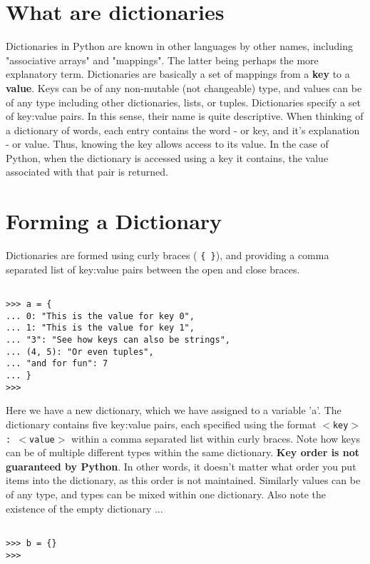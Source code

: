 \section{What are dictionaries}

Dictionaries in Python are known in other languages by other names,   including "associative arrays" and "mappings". The latter being perhaps   the more explanatory term. Dictionaries are basically a set of mappings   from a \textbf{key} to a \textbf{value}. Keys can be of   any non-mutable (not changeable) type, and values can be of any type including other   dictionaries, lists, or tuples. Dictionaries specify a set of key:value   pairs. In this sense, their name is quite descriptive. When thinking of a dictionary of words, each entry contains the word - or key, and it's explanation - or value.     Thus, knowing the key allows access to its value. In the case of Python, when the dictionary is accessed using a key it   contains, the value associated with that pair is returned.

\section{Forming a Dictionary}

Dictionaries are formed using curly braces (
\texttt{\{ \}}), and   providing a comma separated list of key:value pairs between the open   and close braces.
\begin{lstlisting}

>>> a = {
... 0: "This is the value for key 0",
... 1: "This is the value for key 1",
... "3": "See how keys can also be strings",
... (4, 5): "Or even tuples",
... "and for fun": 7
... }
>>>
\end{lstlisting}

Here we have a new dictionary, which we have assigned to a variable   'a'. The dictionary contains five key:value pairs, each specified using   the format 
\texttt{$<$key$>$ : $<$value$>$} within a comma   separated list within curly braces. Note how keys can be of multiple   different types within the same dictionary. \textbf{Key order is not   guaranteed by Python}. In other words, it doesn't matter what order you put items into the dictionary, as this order is not maintained.     Similarly values can be of any type, and   types can be mixed within one dictionary. Also note the existence of   the empty dictionary ...
\begin{lstlisting}

>>> b = {}
>>>
\end{lstlisting}

